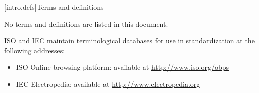 
[intro.defs]{Terms and definitions}

\setcounter{section}{1}
\setcounter{tocdepth}{0}

\setcounter{tocdepth}{1}

No terms and definitions are listed in this document.

ISO and IEC maintain terminological databases for use in standardization at 
the following addresses:
\begin{itemize}
    \item ISO Online browsing platform: available at \url{http://www.iso.org/obps}
    \item IEC Electropedia: available at \url{http://www.electropedia.org}
\end{itemize}


